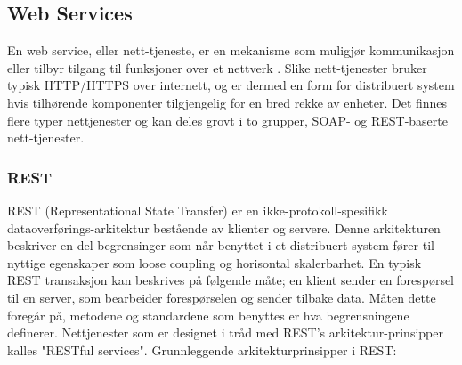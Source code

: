 \documentclass[../main.tex]{subfiles}
\begin{document}
\subsection{Web Services}

En web service, eller nett-tjeneste, er en mekanisme som muligjør kommunikasjon eller tilbyr tilgang til funksjoner over et nettverk . Slike nett-tjenester bruker typisk HTTP/HTTPS over internett, og er dermed en form for distribuert system hvis tilhørende komponenter tilgjengelig for en bred rekke av enheter. Det finnes flere typer nettjenester og kan deles grovt i to grupper, SOAP- og REST-baserte nett-tjenester.  

\subsubsection{REST}

REST (Representational State Transfer) er en ikke-protokoll-spesifikk dataoverførings-arkitektur bestående av klienter og servere. Denne arkitekturen beskriver en del begrensinger som når benyttet i et distribuert system fører til nyttige egenskaper som loose coupling og horisontal skalerbarhet.  En typisk REST transaksjon kan beskrives på følgende måte; en klient sender en forespørsel til en server, som bearbeider forespørselen og sender tilbake data. Måten dette foregår på, metodene og standardene som benyttes er hva begrensningene definerer. Nettjenester som er designet i tråd med REST’s arkitektur-prinsipper kalles "RESTful services".\newline
\newline
Grunnleggende arkitekturprinsipper i REST:
\end{document}
